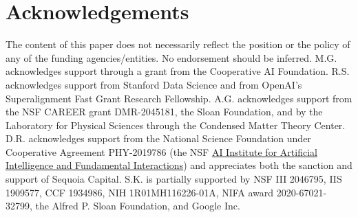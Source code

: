 \section{Acknowledgements}

The content of this paper does not necessarily reflect the position or the policy of any of the funding agencies/entities. No endorsement should be inferred. M.G. acknowledges support through a grant from the Cooperative AI Foundation. R.S. acknowledges support from Stanford Data Science and from OpenAI's Superalignment Fast Grant Research Fellowship.  A.G. acknowledges support from the NSF CAREER grant DMR-2045181, the Sloan Foundation, and by the Laboratory
for Physical Sciences through the Condensed Matter Theory Center.
D.R. acknowledges support from the National Science Foundation under Cooperative Agreement PHY-2019786 (the NSF \href{http://iaifi.org/}{AI Institute for Artificial Intelligence and Fundamental Interactions}) and appreciates both the sanction and support of Sequoia Capital.
S.K. is partially supported by NSF III 2046795, IIS 1909577, CCF 1934986, NIH 1R01MH116226-01A, NIFA award 2020-67021-32799, the Alfred P. Sloan Foundation, and Google Inc.
